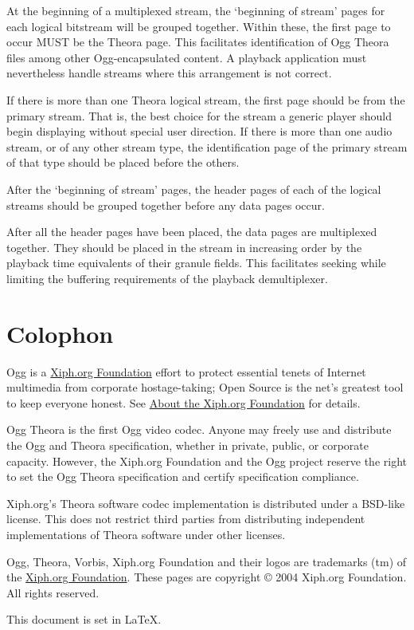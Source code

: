 \documentclass[11pt,letterpaper]{article}
\begin{document}
At the beginning of a multiplexed stream, the `beginning of stream'
 pages for each logical bitstream will be grouped together.
Within these, the first page to occur MUST be the Theora page.
This facilitates identification of Ogg Theora files among other
 Ogg-encapsulated content.
A playback application must nevertheless handle streams where this
 arrangement is not correct.

If there is more than one Theora logical stream, the first page should
 be from the primary stream.
That is, the best choice for the stream a generic player should begin
 displaying without special user direction.
If there is more than one audio stream, or of any other stream
 type, the identification page of the primary stream of that type
 should be placed before the others.

After the `beginning of stream' pages, the header pages of each of
 the logical streams should be grouped together before any data pages
 occur.

After all the header pages have been placed,
 the data pages are multiplexed together.
They should be placed in the stream in increasing order by the playback
 time equivalents of their granule fields.
This facilitates seeking while limiting the buffering requirements of the
 playback demultiplexer.

\section{Colophon}


Ogg is a \href{http://www.xiph.org}{Xiph.org Foundation} effort to protect
 essential tenets of Internet multimedia from corporate hostage-taking; Open
 Source is the net's greatest tool to keep everyone honest.
See \href{http://www.xiph.org/about.html}{About the Xiph.org Foundation} for
 details.

Ogg Theora is the first Ogg video codec.
Anyone may freely use and distribute the Ogg and Theora specification, whether
 in private, public, or corporate capacity.
However, the Xiph.org Foundation and the Ogg project reserve the right to set
 the Ogg Theora specification and certify specification compliance.

Xiph.org's Theora software codec implementation is distributed under a BSD-like
 license.
This does not restrict third parties from distributing independent
 implementations of Theora software under other licenses.

Ogg, Theora, Vorbis, Xiph.org Foundation and their logos are trademarks (tm) of
 the \href{http://www.xiph.org}{Xiph.org Foundation}.
These pages are copyright \copyright{} 2004 Xiph.org Foundation.
All rights reserved.

This document is set in \LaTeX.


\end{document}
